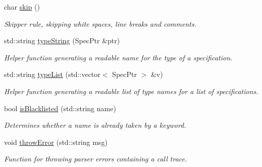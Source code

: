 \begin{DoxyCompactItemize}
char \hyperlink{classgiskard__suturo_1_1GiskardPPParser_a29ed8d6871277989e9ae23c8fa0adbb5}{skip} ()
\begin{DoxyCompactList}\small\item\em Skipper rule, skipping white spaces, line breaks and comments. \end{DoxyCompactList}\item 
std\-::string \hyperlink{classgiskard__suturo_1_1GiskardPPParser_ae34ba71ad3c4018730bd8dffb1c1044c}{type\-String} (Spec\-Ptr \&ptr)
\begin{DoxyCompactList}\small\item\em Helper function generating a readable name for the type of a specification. \end{DoxyCompactList}\item 
std\-::string \hyperlink{classgiskard__suturo_1_1GiskardPPParser_a9907eb00aaf8065f387a5bdac3f5de17}{type\-List} (std\-::vector$<$ Spec\-Ptr $>$ \&v)
\begin{DoxyCompactList}\small\item\em Helper function generating a readable list of type names for a list of specifications. \end{DoxyCompactList}\item 
bool \hyperlink{classgiskard__suturo_1_1GiskardPPParser_a95845d2c48b050a3a000879dbe5968b8}{is\-Blacklisted} (std\-::string name)
\begin{DoxyCompactList}\small\item\em Determines whether a name is already taken by a keyword. \end{DoxyCompactList}\item 
void \hyperlink{classgiskard__suturo_1_1GiskardPPParser_a2a108e8cd73b619ccb1baa943fe6a747}{throw\-Error} (std\-::string msg)
\begin{DoxyCompactList}\small\item\em Function for throwing parser errors containing a call trace. \end{DoxyCompactList}\end{DoxyCompactItemize}
